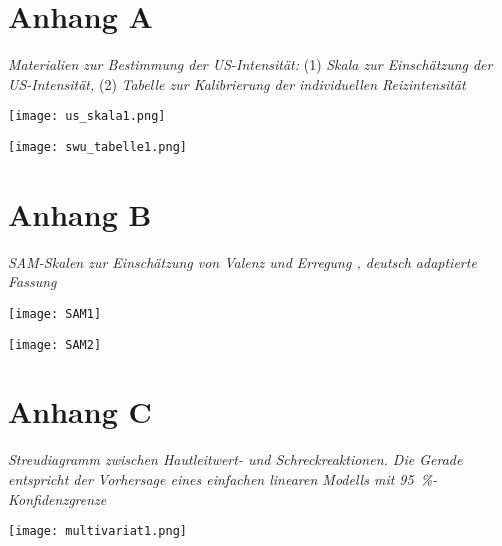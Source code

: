 
\section*{Anhang A} \label{appA}

	\noindent\textit{Materialien zur Bestimmung der US-Intensität:} (1) \textit{Skala zur Einschätzung der US-Intensität,} (2) \textit{Tabelle zur Kalibrierung der individuellen Reizintensität}
	
	\vspace*{2cm}
	\noindent\begin{minipage}[t]{14cm}
		 \texttt{[image: us\_skala1.png]}
	\end{minipage}

	\vspace*{1cm}
	\noindent\begin{minipage}[t]{14cm}
		\vspace*{0.5cm}\texttt{[image: swu\_tabelle1.png]} 
	\end{minipage}
	\newpage
	

\section*{Anhang B} \label{appB}
	
	\noindent\textit{SAM-Skalen zur Einschätzung von Valenz und Erregung \parencite{BRADLEY1994}, deutsch adaptierte Fassung}
		
		\begin{minipage}[t]{0.95\textwidth}
			\texttt{[image: SAM1]} \vspace*{-1cm}
			
			\texttt{[image: SAM2]}
		\end{minipage}
	\newpage


\section*{Anhang C} \label{appC}
	
	\noindent\textit{Streudiagramm zwischen Hautleitwert- und Schreckreaktionen. Die Gerade entspricht der Vorhersage eines einfachen linearen Modells mit \SI{95}{\percent}-Konfidenzgrenze}
		
		\vspace*{2cm}\hspace*{-0.5cm}
		\begin{minipage}[t]{0.95\textwidth}
			\texttt{[image: multivariat1.png]}
		\end{minipage}

